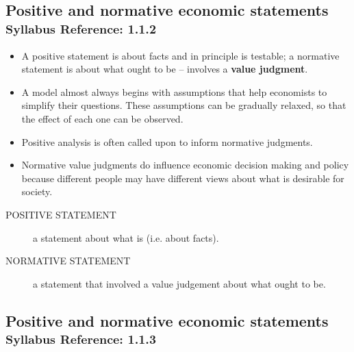 \subsection{Positive and normative economic statements \\
\textsuperscript{Syllabus Reference: 1.1.2}}
\begin{itemize}
\item A positive statement is about facts and in principle is testable; a normative statement is about what ought to be – involves a \textbf{value judgment}.
\item A model almost always begins with assumptions that help economists to simplify their questions. These assumptions can be gradually relaxed, so that the effect of each one can be observed.
\item Positive analysis is often called upon to inform normative judgments.
\item Normative value judgments do influence economic decision making and policy because different people may have different views about what is desirable for society.
\end{itemize}
\begin{description}
\item[POSITIVE STATEMENT] a statement about what is (i.e. about facts).
\item[NORMATIVE STATEMENT] a statement that involved a value judgement about what ought to be.
\end{description}

\subsection{Positive and normative economic statements \\
\textsuperscript{Syllabus Reference: 1.1.3}}
